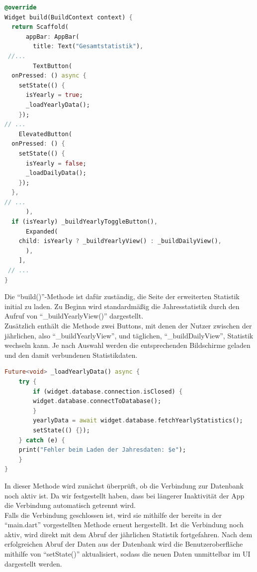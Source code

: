 \documentclass{article}
\begin{document}
    \begin{lstlisting}[language=Dart]
@override
Widget build(BuildContext context) {
  return Scaffold(
      appBar: AppBar(
        title: Text("Gesamtstatistik"),
 //...
        TextButton(
  onPressed: () async {
    setState(() {
      isYearly = true;
      _loadYearlyData();
    });
// ...
    ElevatedButton(
  onPressed: () {
    setState(() {
      isYearly = false;
      _loadDailyData();
    });
  },
// ...
      ),
  if (isYearly) _buildYearlyToggleButton(),
      Expanded(
    child: isYearly ? _buildYearlyView() : _buildDailyView(),
      ),
    ],
 // ...
}
    \end{lstlisting}
    Die \enquote{build()}-Methode ist dafür zuständig, die Seite der erweiterten Statistik initial zu laden.
    Zu Beginn wird standardmäßig die Jahresstatistik durch den Aufruf von \enquote{\_buildYearlyView()} dargestellt. \\
    Zusätzlich enthält die Methode zwei Buttons, mit denen der Nutzer zwischen der jährlichen, also \enquote{_buildYearlyView},
    und täglichen, \enquote{_buildDailyView}, Statistik wechseln kann.
    Je nach Auswahl werden die entsprechenden Bildschirme geladen und den damit verbundenen Statistikdaten.

    \begin{lstlisting}[language=Dart]
Future<void> _loadYearlyData() async {
    try {
        if (widget.database.connection.isClosed) {
        widget.database.connectToDatabase();
        }
        yearlyData = await widget.database.fetchYearlyStatistics();
        setState(() {});
    } catch (e) {
    print("Fehler beim Laden der Jahresdaten: $e");
    }
}
    \end{lstlisting}
    In dieser Methode wird zunächst überprüft, ob die Verbindung zur Datenbank noch aktiv ist.
    Da wir festgestellt haben, dass bei längerer Inaktivität der App die Verbindung automatisch getrennt wird. \\
    Falls die Verbindung geschlossen ist, wird sie mithilfe der bereits in der \enquote{main.dart} vorgestellten
    Methode erneut hergestellt.
    Ist die Verbindung noch aktiv, wird direkt mit dem Abruf der jährlichen Statistik fortgefahren.
    Nach dem erfolgreichen Abruf der Daten aus der Datenbank wird die Benutzeroberfläche mithilfe von
    \enquote{setState()} aktualisiert, sodass die neuen Daten unmittelbar im UI dargestellt werden.
\end{document}
